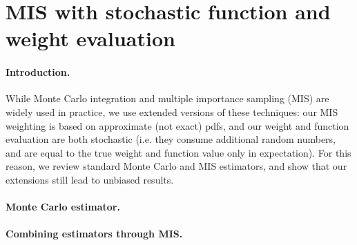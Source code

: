 \section{MIS with stochastic function and weight evaluation}
\label{sec:weight_computation}

\paragraph{Introduction.}

While Monte	Carlo integration and multiple importance sampling (MIS) are widely used in practice, we use extended versions of these techniques: our MIS weighting is based on approximate (not exact) pdfs, and our weight and function evaluation are both stochastic (i.e. they consume additional random numbers, and are  equal to the true weight and function value only in expectation). For this reason, we review standard Monte Carlo and MIS estimators, and show that our extensions still lead to unbiased results.


\paragraph{Monte Carlo estimator.}

%
%
%
%
%
%


\paragraph{Combining estimators through MIS.}

